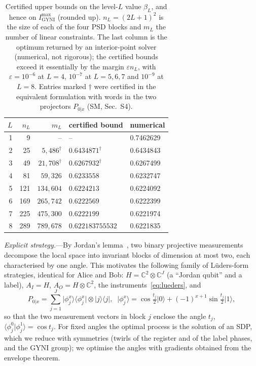 \documentclass[aps,prl,twocolumn,superscriptaddress,longbibliography,nofootinbib]{revtex4-2}
\newcommand{\ket}[1]{\lvert #1\rangle}
\newcommand{\bra}[1]{\langle #1\rvert}
\newcommand{\CC}{\mathbb{C}}
\newcommand{\Imax}{I_{\mathrm{GYNI}}^{\max}}
\begin{document}
\begin{table}[t]
\caption{Certified upper bounds on the level-$L$ value $\beta_L$, and hence on $\Imax$ (rounded up). $n_L=(2L+1)^2$ is the size of each of the four PSD blocks and $m_L$ the number of linear constraints. The last column is the optimum returned by an interior-point solver (numerical, not rigorous); the certified bounds exceed it essentially by the margin $\varepsilon n_L$, with $\varepsilon=10^{-6}$ at $L=4$, $10^{-7}$ at $L=5,6,7$ and $10^{-9}$ at $L=8$. Entries marked $\dagger$ were certified in the equivalent formulation with words in the two projectors $P_{0|x}$ (SM, Sec.~S4).}
\label{tab:levels}
\begin{ruledtabular}
\begin{tabular}{rrrll}
$L$ & $n_L$ & $m_L$ & certified bound & numerical\\
\hline
1 & 9   & --                    & --                          & 0.7462629\\
2 & 25  & $5{,}486^\dagger$     & $0.6434871^\dagger$         & 0.6434843\\
3 & 49  & $21{,}708^\dagger$    & $0.6267932^\dagger$         & 0.6267499\\
4 & 81  & $59{,}326$            & $0.6233558$                 & 0.6232747\\
5 & 121 & $134{,}604$           & $0.6224213$                 & 0.6224092\\
6 & 169 & $265{,}742$           & $0.6222569$                 & 0.6222399\\
7 & 225 & $475{,}300$           & $0.6222199$                 & 0.6221974\\
8 & 289 & $789{,}678$           & $\mathbf{0.622183755532}$   & 0.6221835\\
\end{tabular}
\end{ruledtabular}
\end{table}

\emph{Explicit strategy.}---By Jordan's lemma~\cite{Pironio2009}, two binary projective measurements decompose the local space into invariant blocks of dimension at most two, each characterised by one angle. This motivates the following family of L\"uders-form strategies, identical for Alice and Bob: $H=\CC^2\otimes\CC^J$ (a ``Jordan qubit'' and a label), $A_I=H$, $A_O=H\otimes\CC^2$, the instruments~\eqref{eq:lueders}, and
\begin{equation}
P_{0|x}=\sum_{j=1}^J\ket{\phi_j^x}\bra{\phi_j^x}\otimes\ket{j}\bra{j},\;\;
\ket{\phi_j^x}=\cos\tfrac{t_j}{2}\ket{0}+(-1)^{x+1}\sin\tfrac{t_j}{2}\ket{1},
\label{eq:jordan}
\end{equation}
so that the two measurement vectors in block $j$ enclose the angle $t_j$, $\langle\phi_j^0|\phi_j^1\rangle=\cos t_j$. For fixed angles the optimal process is the solution of an SDP, which we reduce with symmetries (twirls of the register and of the label phases, and the GYNI group); we optimise the angles with gradients obtained from the envelope theorem.
\end{document}
